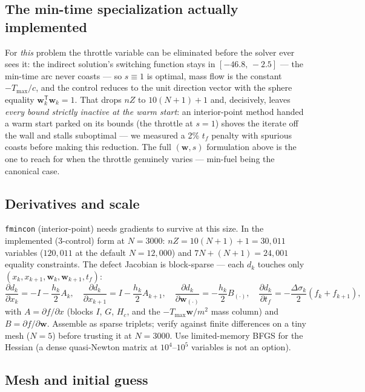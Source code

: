 \documentclass[11pt,letterpaper]{article}
\theoremstyle{noteplain}
\newcommand{\T}{^{\mathsf{T}}}
\newcommand{\code}[1]{\texttt{#1}}
\begin{document}
\subsection*{The min-time specialization actually implemented}

For \emph{this} problem the throttle variable can be eliminated before the
solver ever sees it: the indirect solution's switching function stays in
$[-46.8,\,-2.5]$ --- the min-time arc never coasts --- so $s \equiv 1$ is
optimal, mass flow is the constant $-T_{\max}/c$, and the control reduces
to the unit direction vector with the sphere equality
$\mathbf w_k\T\mathbf w_k = 1$. That drops $nZ$ to $10(N{+}1)+1$ and,
decisively, leaves \emph{every bound strictly inactive at the warm start}:
an interior-point method handed a warm start parked on its bounds (the
throttle at $s = 1$) shoves the iterate off the wall and stalls
suboptimal --- we measured a 2\% $t_f$ penalty with spurious coasts before
making this reduction. The full $(\mathbf w, s)$ formulation above is the
one to reach for when the throttle genuinely varies --- min-fuel being the
canonical case.

\subsection*{Derivatives and scale}

\code{fmincon} (interior-point) needs gradients to survive at this size.
In the implemented (3-control) form at $N = 3000$:
$nZ = 10(N{+}1)+1 = 30{,}011$ variables ($120{,}011$ at the default
$N = 12{,}000$) and $7N + (N{+}1) = 24{,}001$ equality constraints. The
defect Jacobian is block-sparse --- each $d_k$ touches only
$(x_k, x_{k+1}, \mathbf w_k, \mathbf w_{k+1}, t_f)$:
\[
  \frac{\partial d_k}{\partial x_k} = -I - \frac{h_k}{2}A_k,\quad
  \frac{\partial d_k}{\partial x_{k+1}} = I - \frac{h_k}{2}A_{k+1},\quad
  \frac{\partial d_k}{\partial \mathbf w_{(\cdot)}} = -\frac{h_k}{2}B_{(\cdot)},\quad
  \frac{\partial d_k}{\partial t_f} = -\frac{\Delta\sigma_k}{2}(f_k + f_{k+1}),
\]
with $A = \partial f/\partial x$ (blocks $I$, $G$, $H_c$, and the
$-T_{\max}\mathbf w/m^2$ mass column) and
$B = \partial f/\partial \mathbf w$. Assemble as sparse triplets; verify
against finite differences on a tiny mesh ($N=5$) before trusting it at
$N=3000$. Use limited-memory BFGS for the Hessian (a dense quasi-Newton
matrix at $10^4$--$10^5$ variables is not an option).

\subsection*{Mesh and initial guess}
\end{document}
